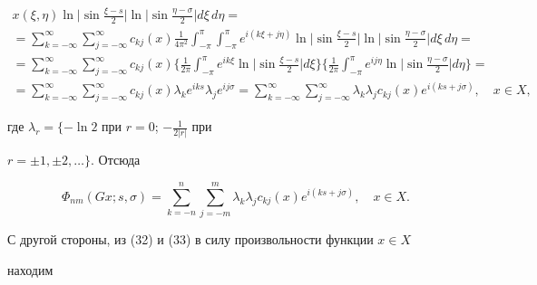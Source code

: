 \begin{pf}
\begin{multline}
x(\xi,\eta) 


\ln\bigg|\sin\frac{\xi-s}{2}\bigg|\ln


\bigg|\sin\frac{\eta-\sigma}{2}\bigg|d\xi\,d\eta =\\


% 


=\sum^\infty_{k=-\infty}\sum^\infty_{j=-\infty} 


c_{k j}(x)\frac{1}{4\pi^2} 


\int^\pi_{-\pi}\int^\pi_{-\pi}e^{i(k\xi+j\eta)} 


\ln\bigg|\sin\frac{\xi-s}{2}\bigg|\ln


\bigg|\sin\frac{\eta-\sigma}{2}\bigg|d\xi\,d\eta = \\


% 


=\sum^\infty_{k=-\infty}\sum^\infty_{j=-\infty}c_{k j}(x)\bigg\{ 


\frac{1}{2\pi}\int^\pi_{-\pi}e^{i k \xi} 


\ln\bigg|\sin\frac{\xi-s}{2}\bigg|d\xi\bigg\}\bigg\{ 


\frac{1}{2\pi}\int^\pi_{-\pi}e^{i j \eta} 


\ln\bigg|\sin\frac{\eta-\sigma}{2}\bigg|d\eta\bigg\}= \\


% 


=\sum^\infty_{k=-\infty}\sum^\infty_{j=-\infty} 


c_{k j}(x)\lambda_k e^{i k s}\lambda_j e^{i j \sigma}= 


\sum^\infty_{k=-\infty}\sum^\infty_{j=-\infty} 


\lambda_k\lambda_j c_{k j}(x)e^{i(ks+j\sigma)},\quad x\in X, 


\end{multline} 


где $\lambda_r=\{-\ln2$ при $r=0$; $-\frac{1}{2|r|}$ при 


$r=\pm1,\pm2,\dotsc\}$. Отсюда 


\begin{equation} 


\Phi_{nm}(G x;s,\sigma)=\sum^n_{k=-n}\sum^m_{j=-m} 


\lambda_k\lambda_j c_{k j}(x)e^{i(ks+j\sigma)},\quad x\in X. 


\end{equation} 


С другой стороны, из (32) и (33) в силу произвольности функции $x\in X$ 


находим 



\end{pf}
